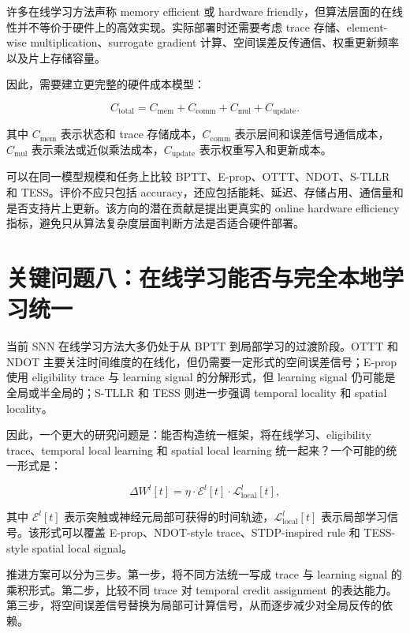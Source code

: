 \documentclass[11pt]{ctexart}
\begin{document}
许多在线学习方法声称 memory efficient 或 hardware friendly，但算法层面的在线性并不等价于硬件上的高效实现。实际部署时还需要考虑 trace 存储、element-wise multiplication、surrogate gradient 计算、空间误差反传通信、权重更新频率以及片上存储容量。

因此，需要建立更完整的硬件成本模型：

\begin{equation}
C_{\mathrm{total}}
=
C_{\mathrm{mem}}
+
C_{\mathrm{comm}}
+
C_{\mathrm{mul}}
+
C_{\mathrm{update}}.
\end{equation}

其中 $C_{\mathrm{mem}}$ 表示状态和 trace 存储成本，$C_{\mathrm{comm}}$ 表示层间和误差信号通信成本，$C_{\mathrm{mul}}$ 表示乘法或近似乘法成本，$C_{\mathrm{update}}$ 表示权重写入和更新成本。

可以在同一模型规模和任务上比较 BPTT、E-prop、OTTT、NDOT、S-TLLR 和 TESS。评价不应只包括 accuracy，还应包括能耗、延迟、存储占用、通信量和是否支持片上更新。该方向的潜在贡献是提出更真实的 online hardware efficiency 指标，避免只从算法复杂度层面判断方法是否适合硬件部署。

\section{关键问题八：在线学习能否与完全本地学习统一}

当前 SNN 在线学习方法大多仍处于从 BPTT 到局部学习的过渡阶段。OTTT 和 NDOT 主要关注时间维度的在线化，但仍需要一定形式的空间误差信号；E-prop 使用 eligibility trace 与 learning signal 的分解形式，但 learning signal 仍可能是全局或半全局的；S-TLLR 和 TESS 则进一步强调 temporal locality 和 spatial locality。

因此，一个更大的研究问题是：能否构造统一框架，将在线学习、eligibility trace、temporal local learning 和 spatial local learning 统一起来？一个可能的统一形式是：

\begin{equation}
\Delta W^l[t]
=
\eta \cdot
\mathcal{E}^l[t]
\cdot
\mathcal{L}^l_{\mathrm{local}}[t],
\end{equation}

其中 $\mathcal{E}^l[t]$ 表示突触或神经元局部可获得的时间轨迹，$\mathcal{L}^l_{\mathrm{local}}[t]$ 表示局部学习信号。该形式可以覆盖 E-prop、NDOT-style trace、STDP-inspired rule 和 TESS-style spatial local signal。

推进方案可以分为三步。第一步，将不同方法统一写成 trace 与 learning signal 的乘积形式。第二步，比较不同 trace 对 temporal credit assignment 的表达能力。第三步，将空间误差信号替换为局部可计算信号，从而逐步减少对全局反传的依赖。
\end{document}
